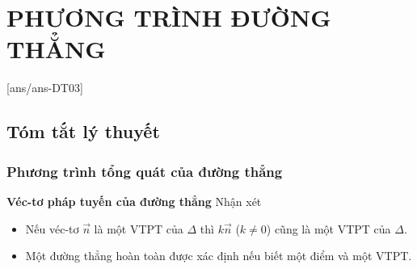 \setcounter{section}{2}
\section{PHƯƠNG TRÌNH ĐƯỜNG THẲNG}
[ans/ans-DT03]
\subsection{Tóm tắt lý thuyết}

\subsubsection{Phương trình tổng quát của đường thẳng}

\textbf{Véc-tơ pháp tuyến của đường thẳng}
	Nhận xét
	\begin{itemize}
		\item Nếu véc-tơ $\overrightarrow{n}$  là một VTPT của $\Delta$ thì $k \overrightarrow{n}$ ($k \ne 0 $) cũng là một VTPT của $\Delta$. 
		\item Một đường thẳng hoàn toàn được xác định nếu biết một điểm và một VTPT.
	\end{itemize}


	
